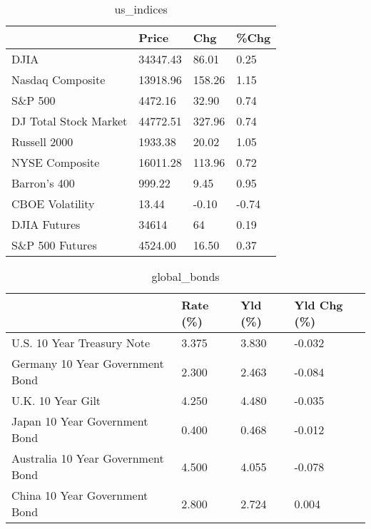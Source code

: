 \documentclass{article}%
\begin{document}
%


\begin{table}[htbp]%
\caption{us\_indices}%
\centering%
\begin{adjustbox}{width=1\textwidth}%
\begin{tabular}{llll}
\toprule
                      &    Price &    Chg &  \%Chg \\
\midrule
                 DJIA & 34347.43 &  86.01 &  0.25 \\
     Nasdaq Composite & 13918.96 & 158.26 &  1.15 \\
              S\&P 500 &  4472.16 &  32.90 &  0.74 \\
DJ Total Stock Market & 44772.51 & 327.96 &  0.74 \\
         Russell 2000 &  1933.38 &  20.02 &  1.05 \\
       NYSE Composite & 16011.28 & 113.96 &  0.72 \\
         Barron's 400 &   999.22 &   9.45 &  0.95 \\
      CBOE Volatility &    13.44 &  -0.10 & -0.74 \\
         DJIA Futures &    34614 &     64 &  0.19 \\
      S\&P 500 Futures &  4524.00 &  16.50 &  0.37 \\
\bottomrule
\end{tabular}
%
\end{adjustbox}%
\end{table}

%


\begin{table}[htbp]%
\caption{global\_bonds}%
\centering%
\begin{adjustbox}{width=1\textwidth}%
\begin{tabular}{llll}
\toprule
                                  & Rate (\%) & Yld (\%) & Yld Chg (\%) \\
\midrule
       U.S. 10 Year Treasury Note &    3.375 &   3.830 &      -0.032 \\
  Germany 10 Year Government Bond &    2.300 &   2.463 &      -0.084 \\
                U.K. 10 Year Gilt &    4.250 &   4.480 &      -0.035 \\
    Japan 10 Year Government Bond &    0.400 &   0.468 &      -0.012 \\
Australia 10 Year Government Bond &    4.500 &   4.055 &      -0.078 \\
    China 10 Year Government Bond &    2.800 &   2.724 &       0.004 \\
\bottomrule
\end{tabular}
%
\end{adjustbox}%
\end{table}
\end{document}
